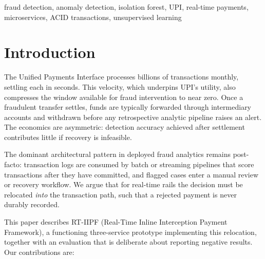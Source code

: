\documentclass[conference]{IEEEtran}
\begin{document}
\begin{IEEEkeywords}
fraud detection, anomaly detection, isolation forest, UPI, real-time
payments, microservices, ACID transactions, unsupervised learning
\end{IEEEkeywords}

\section{Introduction}

The Unified Payments Interface processes billions of transactions monthly,
settling each in seconds. This velocity, which underpins UPI's utility, also
compresses the window available for fraud intervention to near zero. Once a
fraudulent transfer settles, funds are typically forwarded through
intermediary accounts and withdrawn before any retrospective analytic
pipeline raises an alert. The economics are asymmetric: detection accuracy
achieved after settlement contributes little if recovery is infeasible.

The dominant architectural pattern in deployed fraud analytics remains
post-facto: transaction logs are consumed by batch or streaming pipelines
that score transactions after they have committed, and flagged cases enter a
manual review or recovery workflow. We argue that for real-time rails the
decision must be relocated \emph{into} the transaction path, such that a
rejected payment is never durably recorded.

This paper describes RT-IIPF (Real-Time Inline Interception Payment
Framework), a functioning three-service prototype implementing this
relocation, together with an evaluation that is deliberate about reporting
negative results. Our contributions are:
\end{document}
